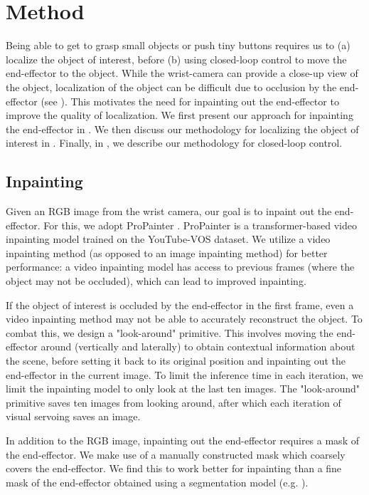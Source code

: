 \section{Method}



Being able to get to grasp small objects or push tiny buttons requires us to (a) localize the object of interest, before (b) using closed-loop control to move the end-effector to the object.
While the wrist-camera can provide a close-up view of the object, localization of the object can be difficult due to occlusion by the end-effector (see ). 
This motivates the need for inpainting out the end-effector to improve the quality of localization.
We first present our approach for inpainting the end-effector in .
We then discuss our methodology for localizing the object of interest in .
Finally, in , we describe our methodology for closed-loop control. %

\subsection{Inpainting}
Given an RGB image from the wrist camera, our goal is to inpaint out the end-effector. 
For this, we adopt ProPainter \cite{zhou2023propainter}.
ProPainter is a transformer-based video inpainting model trained on the YouTube-VOS \cite{xu2018youtube} dataset.
We utilize a video inpainting method (as opposed to an image inpainting method) for better performance: 
a video inpainting model has access to previous frames (where the object may not be occluded), which can lead to improved inpainting.

If the object of interest is occluded by the end-effector in the first frame, even a video inpainting method may not be able to accurately reconstruct the object.
To combat this, we design a "look-around" primitive.
This involves moving the end-effector around (vertically and laterally) to obtain contextual information about the scene, before setting it back to its original position and inpainting out the end-effector in the current image.
To limit the inference time in each iteration, we limit the inpainting model to only look at the last ten images. 
The "look-around" primitive saves ten images from looking around, after which each iteration of visual servoing saves an image.

In addition to the RGB image, inpainting out the end-effector requires a mask of the end-effector.
We make use of a manually constructed mask which coarsely covers the end-effector.
We find this to work better for inpainting than a fine mask of the end-effector obtained using a segmentation model (e.g. \cite{kirillov2023segment}).


